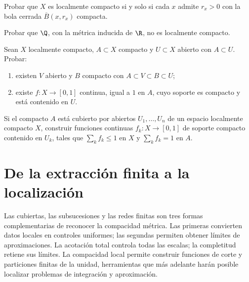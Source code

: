 \begin{ejercicio}\label{ej:lectura-15-3}
Probar que $X$ es localmente compacto si y solo si cada $x$ admite $r_x>0$ con la bola cerrada $\overline B(x,r_x)$ compacta.
\end{ejercicio}


\begin{ejercicio}\label{ej:lectura-15-4}
Probar que $\Q$, con la métrica inducida de $\R$, no es localmente compacto.
\end{ejercicio}


\begin{ejercicio}\label{ej:lectura-15-5}
Sean $X$ localmente compacto, $A\subset X$ compacto y $U\subset X$ abierto con $A\subset U$. Probar:
\begin{enumerate}[label=(\roman*)]
\item existen $V$ abierto y $B$ compacto con $A\subset V\subset B\subset U$;
\item existe $f:X\to[0,1]$ continua, igual a $1$ en $A$, cuyo soporte es compacto y está contenido en $U$.
\end{enumerate}
\end{ejercicio}


\begin{ejercicio}\label{ej:lectura-15-6}
Si el compacto $A$ está cubierto por abiertos $U_1,\ldots,U_n$ de un espacio localmente compacto $X$, construir funciones continuas $f_k:X\to[0,1]$ de soporte compacto contenido en $U_k$, tales que $\sum_k f_k\le1$ en $X$ y $\sum_kf_k=1$ en $A$.
\end{ejercicio}


\section{De la extracción finita a la localización}
Las cubiertas, las subsucesiones y las redes finitas son tres formas complementarias de reconocer la compacidad métrica. Las primeras convierten datos locales en controles uniformes; las segundas permiten obtener límites de aproximaciones. La acotación total controla todas las escalas; la completitud retiene sus límites. La compacidad local permite construir funciones de corte y particiones finitas de la unidad, herramientas que más adelante harán posible localizar problemas de integración y aproximación.
